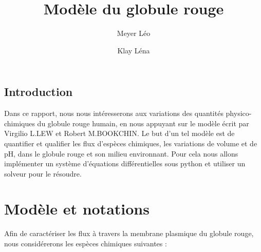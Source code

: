 \documentclass[a4paper,fleqn]{article}
\title{Modèle du globule rouge}           %
\author{Meyer Léo \and Klay Léna}
\date{}                       %
\begin{document}
\maketitle                    %


\subsection*{Introduction}

Dans ce rapport, nous nous intéresserons aux variations des quantités physico-chimiques  du globule rouge humain, en nous appuyant sur le modèle écrit par Virgilio L.LEW et Robert M.BOOKCHIN. Le but d'un tel modèle est de quantifier et qualifier les flux d'espèces chimiques, les variations de volume et de pH, dans le globule rouge et son milieu environnant. Pour cela nous allons implémenter un système d'équations différentielles sous python et utiliser un solveur pour le résoudre.


\tableofcontents              %


\section{Modèle et notations}               %

Afin de caractériser les flux à travers la membrane plasmique du globule rouge, nous considérerons les espèces chimiques suivantes :
\end{document}
